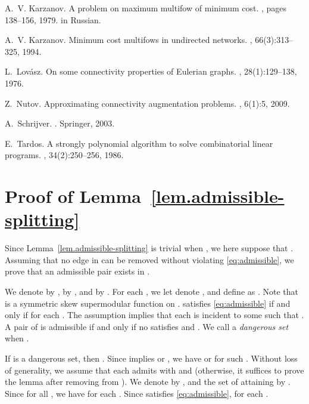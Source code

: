 \documentclass{article}
\begin{document}
\begin{thebibliography}{10}
A.~V. Karzanov.
\newblock A problem on maximum multifow of minimum cost.
, pages 138--156, 1979.
\newblock in Russian.

A.~V. Karzanov.
\newblock Minimum cost multifows in undirected networks.
, 66(3):313--325, 1994.

L.~Lov\'asz.
\newblock On some connectivity properties of {E}ulerian graphs.
, 28(1):129--138, 1976.

Z.~Nutov.
\newblock Approximating connectivity augmentation problems.
, 6(1):5, 2009.

A.~Schrijver.
.
\newblock Springer, 2003.

E.~Tardos.
\newblock A strongly polynomial algorithm to solve combinatorial linear
  programs.
, 34(2):250--256, 1986.

\end{thebibliography}

\appendix

\section{Proof of Lemma~\ref{lem.admissible-splitting}}
\label{sec:splitting}
Since Lemma~\ref{lem.admissible-splitting} is trivial when ,
we here suppose that .
Assuming that no edge in  can be removed without violating \eqref{eq:admissible},
we prove that an admissible pair exists in .

We denote 
 by ,
 by ,
and  by .
For each ,
we let  denote ,
and define  as 
.
Note that  is a symmetric skew supermodular function on .
 satisfies \eqref{eq:admissible} if and only if
 for each .
The assumption implies that
each  is incident to some 
such that .
A pair of  is admissible if and only if no  satisfies
 and .
We call  a \emph{dangerous set} when
.


If  is a dangerous set,
then . Since  implies
 or ,
we have  or  for such .
Without loss of generality, we assume that
each  admits  with  and 
(otherwise, it suffices to prove the lemma after removing  from ).
We denote 
 by ,
and the set of  attaining 
by .
Since  for all ,
we have  for each .
Since  satisfies \eqref{eq:admissible},
 for each .
\end{document}
